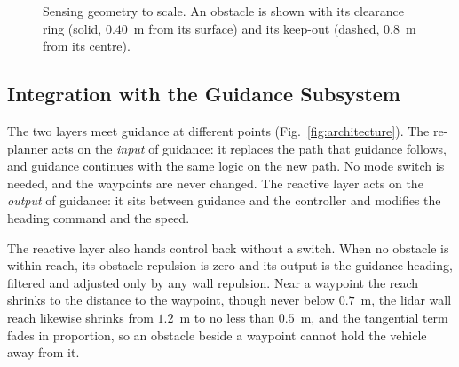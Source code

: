 \begin{figure}[!t]
    \centering
    \caption{Sensing geometry to scale. An obstacle is shown with its
    clearance ring (solid, $0.40$~m from its surface) and its keep-out
    (dashed, $0.8$~m from its centre).}
    \label{fig:sensing}
\end{figure}

\subsection{Integration with the Guidance Subsystem}
The two layers meet guidance at different points
(Fig.~\ref{fig:architecture}). The re-planner acts on the \emph{input} of guidance:
it replaces the path that guidance follows, and guidance continues with
the same logic on the new path. No mode switch is needed, and the
waypoints are never changed. The reactive layer acts on the
\emph{output} of guidance: it sits between guidance and the controller and modifies
the heading command and the speed.

The reactive layer also hands control back without a switch. When no
obstacle is within reach, its obstacle repulsion is zero and its output
is the guidance heading, filtered and adjusted only by any wall
repulsion. Near a waypoint the reach shrinks to the distance to the
waypoint, though never below $0.7$~m, the lidar wall reach likewise
shrinks from $1.2$~m to no less than $0.5$~m, and the tangential term
fades in proportion, so an obstacle beside a waypoint cannot hold the vehicle
away from it.

